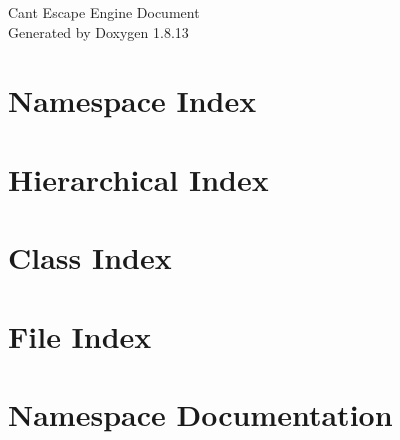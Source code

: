 \documentclass[twoside]{book}
\newcommand{\+}{\discretionary{\mbox{\scriptsize$\hookleftarrow$}}{}{}}
\newcommand{\clearemptydoublepage}{%
  \newpage{\pagestyle{empty}\cleardoublepage}%
}
\begin{document}
\hypersetup{pageanchor=false,
             bookmarksnumbered=true,
             pdfencoding=unicode
            }
\begin{titlepage}
\vspace*{7cm}
\begin{center}%
{\Large Cant Escape Engine Document }\\
\vspace*{1cm}
{\large Generated by Doxygen 1.8.13}\\
\end{center}
\end{titlepage}
\clearemptydoublepage
{}
\tableofcontents
\clearemptydoublepage
{}
\hypersetup{pageanchor=true}

\chapter{Namespace Index}

\chapter{Hierarchical Index}

\chapter{Class Index}

\chapter{File Index}

\chapter{Namespace Documentation}



\end{document}
